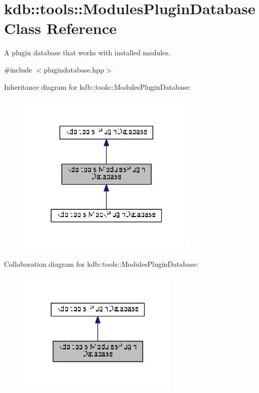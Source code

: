 \hypertarget{classkdb_1_1tools_1_1ModulesPluginDatabase}{\section{kdb\+:\+:tools\+:\+:Modules\+Plugin\+Database Class Reference}
\label{classkdb_1_1tools_1_1ModulesPluginDatabase}
}


A plugin database that works with installed modules.  




{\ttfamily \#include $<$plugindatabase.\+hpp$>$}



Inheritance diagram for kdb\+:\+:tools\+:\+:Modules\+Plugin\+Database\+:
\nopagebreak
\begin{figure}[H]
\begin{center}
\leavevmode
\includegraphics[width=244pt]{classkdb_1_1tools_1_1ModulesPluginDatabase__inherit__graph}
\end{center}
\end{figure}


Collaboration diagram for kdb\+:\+:tools\+:\+:Modules\+Plugin\+Database\+:
\nopagebreak
\begin{figure}[H]
\begin{center}
\leavevmode
\includegraphics[width=218pt]{classkdb_1_1tools_1_1ModulesPluginDatabase__coll__graph}
\end{center}
\end{figure}
